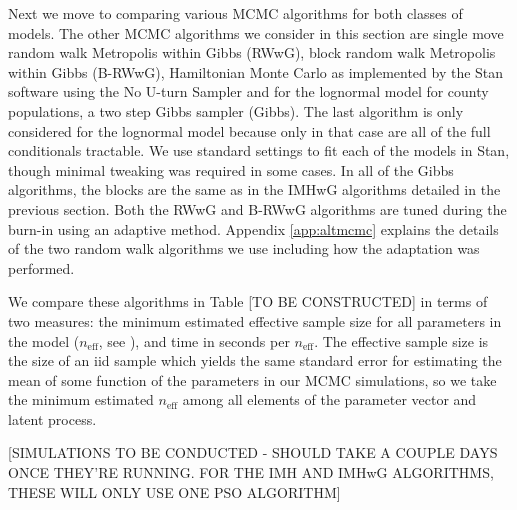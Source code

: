 \documentclass[12pt]{article}
\begin{document}
Next we move to comparing various MCMC algorithms for both classes of models. The other MCMC algorithms we consider in this section are single move random walk Metropolis within Gibbs (RWwG), block random walk Metropolis within Gibbs (B-RWwG), Hamiltonian Monte Carlo as implemented by the Stan software \citep{carpenter2015stan} using the No U-turn Sampler \citep{homan2014no} and for the lognormal model for county populations, a two step Gibbs sampler (Gibbs). The last algorithm is only considered for the lognormal model because only in that case are all of the full conditionals tractable. We use standard settings to fit each of the models in Stan, though minimal tweaking was required in some cases. In all of the Gibbs algorithms, the blocks are the same as in the IMHwG algorithms detailed in the previous section. Both the RWwG and B-RWwG algorithms are tuned during the burn-in using an adaptive method. Appendix \ref{app:altmcmc} explains the details of the two random walk algorithms we use including how the adaptation was performed. 

We compare these algorithms in Table [TO BE CONSTRUCTED] %
 in terms of two measures: the minimum estimated effective sample size for all parameters in the model ($n_{\text{eff}}$, see \citet[Section~12.3.5]{robert2013monte}), and time in seconds per $n_{\text{eff}}$. The effective sample size is the size of an iid sample which yields the same standard error for estimating the mean of some function of the parameters in our MCMC simulations, so we take the minimum estimated $n_{\text{eff}}$ among all elements of the parameter vector and latent process. 

[SIMULATIONS TO BE CONDUCTED - SHOULD TAKE A COUPLE DAYS ONCE THEY'RE RUNNING. FOR THE IMH AND IMHwG ALGORITHMS, THESE WILL ONLY USE ONE PSO ALGORITHM]


\end{document}
